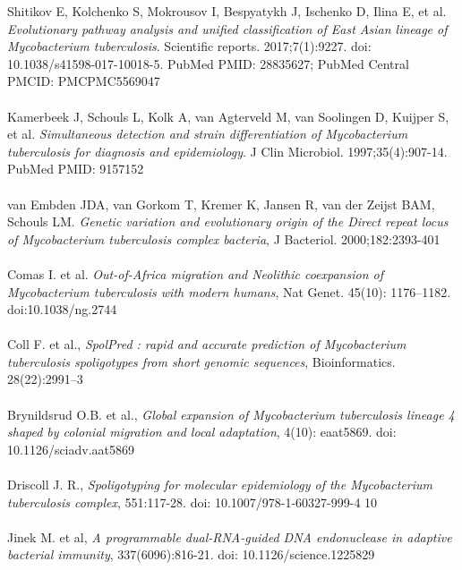 \documentclass[twoside,a4paper,11pt,frenchb,openany]{report}
\begin{document}
\begin{spacing}{0.5}
\begin{thebibliography}{10}
Shitikov E, Kolchenko S, Mokrousov I, Bespyatykh J, Ischenko D, Ilina E, et al. \textit{Evolutionary pathway analysis and unified classification of
East Asian lineage of Mycobacterium tuberculosis}. Scientific reports.
2017;7(1):9227. doi: 10.1038/s41598-017-10018-5. PubMed PMID: 28835627;
PubMed Central PMCID: PMCPMC5569047\\ \\

Kamerbeek J, Schouls L, Kolk A, van Agterveld M, van Soolingen D, Kuijper S, et al. \textit{Simultaneous detection and strain differentiation of
Mycobacterium tuberculosis for diagnosis and epidemiology}. J Clin
Microbiol. 1997;35(4):907-14. PubMed PMID: 9157152\\ \\

van Embden JDA, van Gorkom T, Kremer K, Jansen R, van der Zeijst BAM,
Schouls LM. \textit{Genetic variation and evolutionary origin of the Direct
repeat locus of Mycobacterium tuberculosis complex bacteria}, J
Bacteriol. 2000;182:2393-401\\ \\

Comas I. et al. \textit{Out-of-Africa migration and Neolithic coexpansion of Mycobacterium tuberculosis with modern humans}, Nat Genet. 45(10): 1176–1182. doi:10.1038/ng.2744\\ \\

Coll F. et al., \textit{SpolPred : rapid and accurate prediction of Mycobacterium tuberculosis spoligotypes from short genomic sequences}, Bioinformatics. 28(22):2991–3\\ \\

Brynildsrud O.B. et al., \textit{Global expansion of Mycobacterium tuberculosis lineage 4 shaped by colonial migration and local adaptation}, 4(10): eaat5869. doi: 10.1126/sciadv.aat5869\\ \\

Driscoll J. R., \textit{Spoligotyping for molecular epidemiology of the Mycobacterium tuberculosis complex}, 551:117-28. doi: 10.1007/978-1-60327-999-4 10\\ \\

Jinek M. et al, \textit{A programmable dual-RNA-guided DNA endonuclease in adaptive bacterial immunity}, 337(6096):816-21. doi: 10.1126/science.1225829\\ \\


\end{thebibliography}
\end{spacing}
\end{document}
